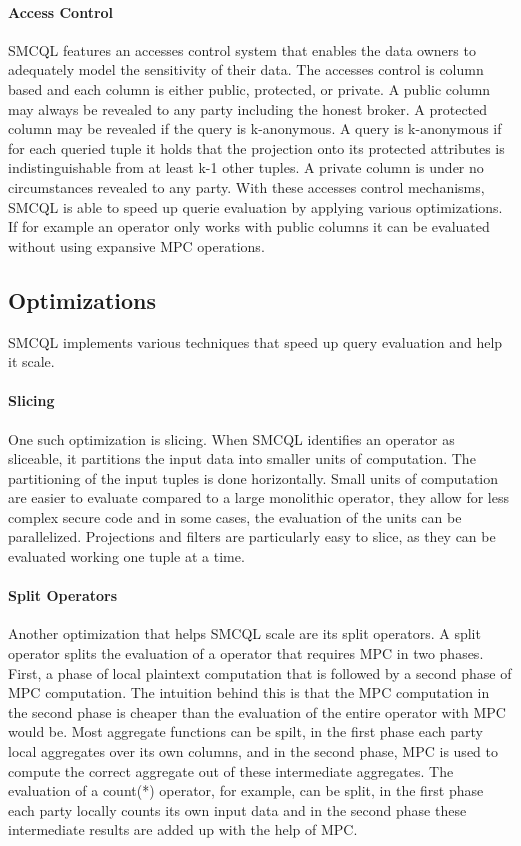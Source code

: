 \label{Accesses_label}	
\paragraph{Access Control}
SMCQL features an accesses control system that enables the data owners to adequately model the sensitivity of their data. 
The accesses control is column based and each column is either public, protected, or private. 
A public column may always be revealed to any party including the honest broker. A protected column may be revealed if the query is k-anonymous. A query is k-anonymous if for each queried tuple it holds that the projection onto its protected attributes is indistinguishable from at least k-1 other tuples. A private column is under no circumstances revealed to any party. With these accesses control mechanisms, SMCQL is able to speed up querie evaluation by applying various optimizations. If for example an operator only works with public columns it can be evaluated without using expansive MPC operations.


\label{sec:Optimizations_smcql}
\subsection{Optimizations}
SMCQL implements various techniques that speed up query evaluation and help it scale. 
\paragraph{Slicing}
One such optimization is slicing. When SMCQL identifies an operator as sliceable, it partitions the input data into smaller units of computation. The partitioning of the input tuples is done horizontally. Small units of computation are easier to evaluate compared to a large monolithic operator, they allow for less complex secure code and in some cases, the evaluation of the units can be parallelized. Projections and filters are particularly easy to slice, as they can be evaluated working one tuple at a time.
\paragraph{Split Operators} %
Another optimization that helps SMCQL scale are its split operators. A split operator splits the evaluation of a operator that requires MPC in two phases. First, a phase of local plaintext computation that is followed by a second phase of MPC computation. The intuition behind this is that the MPC computation in the second phase is cheaper than the evaluation of the entire operator with MPC would be. Most aggregate functions can be spilt, in the first phase each party local aggregates over its own columns, and in the second phase, MPC is used to compute the correct aggregate out of these intermediate aggregates. The evaluation of a count(*) operator, for example, can be split, in the first phase each party locally counts its own input data and in the second phase these intermediate results are added up with the help of MPC. %



